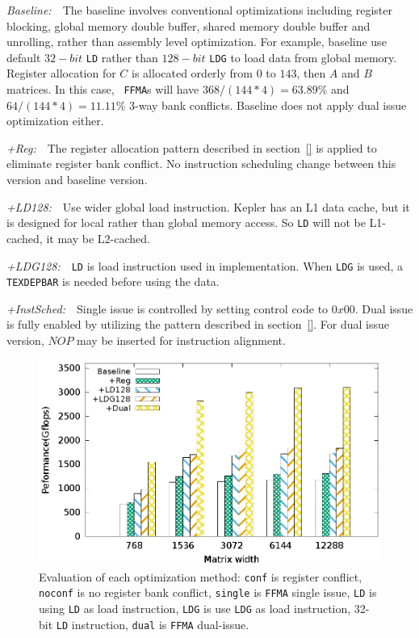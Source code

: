 \documentclass{sig-alternate-05-2015}
\begin{document}
{\it Baseline:}~~The baseline involves conventional optimizations including register blocking, global
memory double buffer, shared memory double buffer and unrolling, rather than assembly level optimization.
For example, baseline use default $32-bit$ {\tt LD} rather than $128-bit$ {\tt LDG} to load data from global memory.
Register allocation for $C$ is allocated orderly from $0$ to $143$, then $A$ and $B$ matrices. In this case, {\tt
FFMA}s will have $368/(144*4)=63.89\%$ and $64/(144*4)=11.11\%$ 3-way bank conflicts. Baseline does not apply dual
issue optimization either.

{\it +Reg:}~~The register allocation pattern described in section~\ref{} is applied to eliminate register bank conflict. No
instruction scheduling change between this version and baseline version.

{\it +LD128:}~~Use wider global load instruction.
Kepler has an L1 data cache, but it is designed for local rather than global memory access. So {\tt LD} will not be L1-cached, it may be L2-cached.

{\it +LDG128:}~~{\tt LD} is load instruction used in implementation. When {\tt LDG} is used, a {\tt TEXDEPBAR} is needed before using the data. 

{\it +InstSched:}~~Single issue is controlled by setting control code to $0x00$. Dual issue is fully enabled by utilizing the pattern described in section~\ref{}. For dual issue version, $NOP$ may be inserted for instruction alignment.

\begin{figure}[htbp]
\begin{center}
\includegraphics[scale=0.65]{tn_prof}
    \caption{Evaluation of each optimization method: {\tt conf} is register conflict, {\tt noconf} is no register bank conflict,
    {\tt single} is {\tt FFMA} single issue, {\tt LD} is using {\tt LD} as load instruction, {\tt LDG} is use {\tt LDG}
    as load instruction, 32-bit {\tt LD} instruction, {\tt dual} is {\tt FFMA} dual-issue.}
\label{fig:th_prof}
\end{center}
\end{figure}
\end{document}
